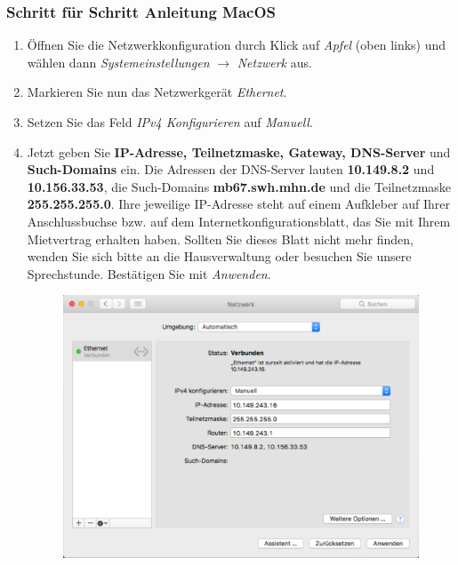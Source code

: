 \documentclass[a4paper,12pt]{scrartcl}
\begin{document}
\subsubsection*{Schritt für Schritt Anleitung MacOS}
\begin{enumerate}
    \item Öffnen Sie die Netzwerkkonfiguration durch Klick auf \emph{Apfel} (oben links) und wählen dann \emph{Systemeinstellungen} $\rightarrow$ \emph{Netzwerk} aus.
    \item Markieren Sie nun das Netzwerkgerät \emph{Ethernet}.
    \item Setzen Sie das Feld \emph{IPv4 Konfigurieren} auf \emph{Manuell}.
    \item Jetzt geben Sie \textbf{IP-Adresse, Teilnetzmaske, Gateway, DNS-Server} und \textbf{Such-Domains} ein. Die Adressen der DNS-Server lauten \textbf{10.149.8.2} und \textbf{10.156.33.53}, die Such-Domains \textbf{mb67.swh.mhn.de} und die Teilnetzmaske \textbf{255.255.255.0}. Ihre jeweilige IP-Adresse steht auf einem Aufkleber auf Ihrer Anschlussbuchse bzw. auf dem Internetkonfigurationsblatt, das Sie mit Ihrem Mietvertrag erhalten haben. Sollten Sie dieses Blatt nicht mehr finden, wenden Sie sich bitte an die Hausverwaltung oder besuchen Sie unsere Sprechstunde. Bestätigen Sie mit \emph{Anwenden}.
      \begin{figure}[h!]
      \centering
        \begin{minipage}[c]{0.60\linewidth}
          \centering
          \includegraphics[width=0.9\linewidth,keepaspectratio]{Bilder/IP_MAC_mb}
        \end{minipage}
      \vspace{-20pt}
      \end{figure}
\end{enumerate}
\vspace{-10pt}
\end{document}
